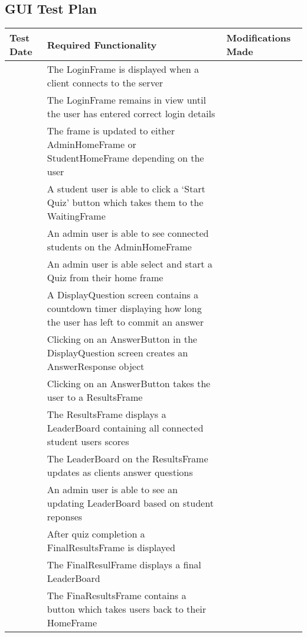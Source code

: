 \subsection{GUI Test Plan}
\label{sub:gui_test_plan}

\renewcommand{\arraystretch}{1.5}
\begin{longtabu}{l X X}
	\toprule
Test Date	&Required Functionality 	&Modifications Made\\
\midrule
	&The LoginFrame is displayed when a client connects to the server	&\\
	&The LoginFrame remains in view until the user has entered correct login details	&\\
	&The frame is updated to either AdminHomeFrame or StudentHomeFrame depending on the user	&\\
	&A student user is able to click a `Start Quiz' button which takes them to the WaitingFrame	&\\
	&An admin user is able to see connected students on the AdminHomeFrame	&\\
	&An admin user is able select and start a Quiz from their home frame	&\\
	&A DisplayQuestion screen contains a countdown timer displaying how long the user has left to commit an answer 	&\\
	&Clicking on an AnswerButton in the DisplayQuestion screen creates an AnswerResponse object	&\\
	&Clicking on an AnswerButton takes the user to a ResultsFrame	&\\
	&The ResultsFrame displays a LeaderBoard containing all connected student users scores	&\\
	&The LeaderBoard on the ResultsFrame updates as clients answer questions	&\\
	&An admin user is able to see an updating LeaderBoard based on student reponses	&\\
	&After quiz completion a FinalResultsFrame is displayed	&\\
	&The FinalResulFrame displays a final LeaderBoard	&\\
	&The FinaResultsFrame contains a button which takes users back to their HomeFrame	&\\
	\bottomrule
	\end{longtabu}
